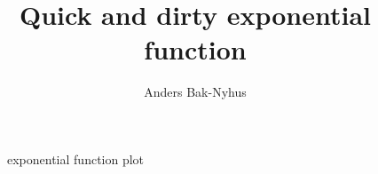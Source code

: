 \documentclass[]{article}
\title{Quick and dirty exponential function}
\author{Anders Bak-Nyhus}
\date{}
\begin{document}
\maketitle

\blindtext

\begin{figure}[h]
	
	\caption{exponential function plot}
	\label{fig:gpl}
\end{figure}
\end{document}
